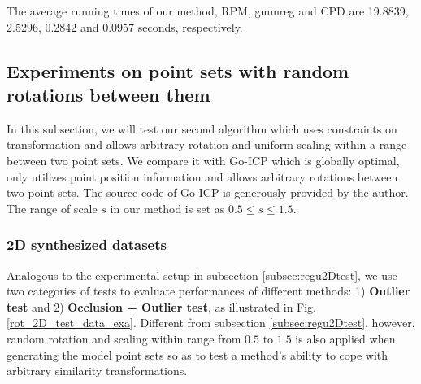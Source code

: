 \documentclass[11pt,bezier,]{article}
\begin{document}
      
The average running times of our method,
RPM, gmmreg and CPD  are 
19.8839, %
     2.5296,
    0.2842 and
    0.0957 seconds, respectively.      
    
    
\subsection{Experiments on point sets with random rotations  between them}
In this subsection,
we will test our second algorithm which uses constraints on transformation
and allows arbitrary rotation and uniform scaling within a range between two point sets.
We compare it with Go-ICP \cite{Go-ICP}
which is globally optimal,
only utilizes point position information and 
allows arbitrary rotations between two point sets.
The source code of Go-ICP is generously provided by the author. %
The range of scale $s$ in our method is set as $0.5\le s\le 1.5$.



\subsubsection{2D synthesized datasets  \label{subsec:simi2Dtest}}

Analogous  to the experimental setup in   subsection \ref{subsec:regu2Dtest},
we use two categories  of tests to evaluate  performances of different methods:
1) \textbf{Outlier test} and
2) \textbf{Occlusion + Outlier test},
as illustrated in  Fig. \ref{rot_2D_test_data_exa}.
Different from subsection \ref{subsec:regu2Dtest}, however,
random rotation and scaling within range from $0.5$ to $1.5$
is also applied when generating the model point sets
so as to test a method's ability to cope with arbitrary similarity transformations.
\end{document}
